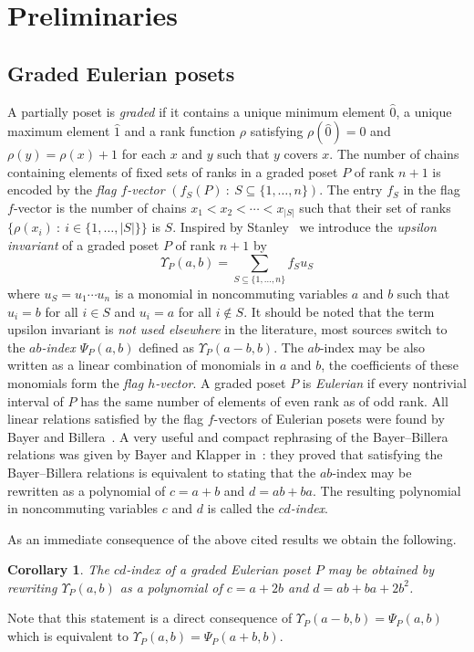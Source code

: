 \documentclass[reqno,12pt]{amsart}
\numberwithin{equation}{section}
\newtheorem{corollary}[theorem]{Corollary}
\newcommand{\0}{\widehat{0}}
\newcommand{\1}{\widehat{1}}
\newcommand{\2}{\widehat{2}}
\begin{document}
\section{Preliminaries}

\subsection{Graded Eulerian posets}

A partially poset is
{\em graded} if it contains a unique minimum element $\0$, a unique
maximum element $\1$ and a rank function $\rho$ satisfying $\rho(\0)=0$
and $\rho(y)=\rho(x)+1$ for each $x$ and $y$ such that $y$ covers $x$.
The number of chains containing elements of  fixed sets of ranks in 
a graded poset $P$ of rank $n+1$  is encoded by the {\em flag
  $f$-vector} $(f_S(P)\::\: S\subseteq \{1,\ldots,n\})$. The entry $f_S$
in the flag $f$-vector  is the number of chains
$x_1<x_2<\cdots<x_{|S|}$ such that their set of ranks $\{\rho(x_i)\::\:
i\in \{1,\ldots,|S|\}\}$ is $S$. Inspired by Stanley~\cite{Stanley-flag} we introduce
the {\em upsilon invariant} of a graded poset $P$ of rank $n+1$ by 
$$
\Upsilon_P(a,b)=\sum_{S\subseteq \{1,\ldots,n\}} f_S u_S
$$
where $u_S=u_1\cdots u_n$ is a monomial in noncommuting variables $a$
and $b$ such that $u_i=b$ for all $i\in S$ and $u_i=a$ for all $i\not\in
S$. It should be noted that the term upsilon invariant is {\em not used
elsewhere} in the literature, most sources switch to the {\em $ab$-index
  $\Psi_P(a,b)$} defined as $\Upsilon_P(a-b,b)$. The
$ab$-index may be also written as a linear combination of monomials in
$a$ and $b$, the coefficients of these monomials form the {\em flag $h$-vector}.
A graded poset $P$ is {\em Eulerian} if every nontrivial interval of $P$
has the same number of elements of even rank as of odd rank. All linear
relations satisfied by the flag $f$-vectors of Eulerian posets were
found by Bayer and Billera~\cite{Bayer-Billera}. A very useful and
compact rephrasing of the Bayer--Billera relations was given by Bayer and
Klapper in~\cite{Bayer-Klapper}: they proved that satisfying the
Bayer--Billera relations is equivalent to stating that the $ab$-index may
be rewritten as a polynomial of $c=a+b$ and $d=ab+ba$. The resulting
polynomial in noncommuting variables $c$ and $d$ is called the {\em
  $cd$-index}.  

As an immediate consequence of the above cited results we obtain the
following.
\begin{corollary}
The $cd$-index of a graded Eulerian poset $P$ may be obtained by
rewriting $\Upsilon_P(a,b)$ as a polynomial of $c=a+2b$ and $d=ab+ba+2b^2$.
\end{corollary}  
Note that this statement is a direct consequence of
$\Upsilon_P(a-b,b)=\Psi_P(a,b)$ which is equivalent to
$\Upsilon_P(a,b)=\Psi_P(a+b,b)$.  
\end{document}

